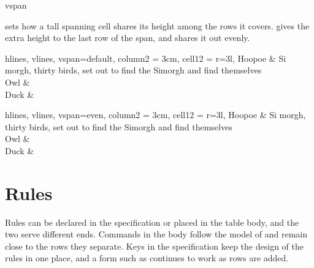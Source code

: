 \begin{codedescribe}[
    key,
    new=2021L
  ]{vspan}
  \begin{codesyntax}
  \end{codesyntax}
   sets how a tall spanning cell shares its height among the rows it covers.  gives the extra height to the last row of the span, and  shares it out evenly.

  \begin{codestore}[st=span:vspan]
    \begin{tblr}{
        hlines, vlines, vspan=default,
        column{2} = {3cm},
        cell{1}{2} = {r=3}{l},
      }
      Hoopoe & Si morgh, thirty birds, set out to find the Simorgh
      and find themselves                                          \\
      Owl    &                                                     \\
      Duck   &                                                     \\
    \end{tblr}\quad
    \begin{tblr}{
        hlines, vlines, vspan=even,
        column{2} = {3cm},
        cell{1}{2} = {r=3}{l},
      }
      Hoopoe & Si morgh, thirty birds, set out to find the Simorgh
      and find themselves                                          \\
      Owl    &                                                     \\
      Duck   &                                                     \\
    \end{tblr}\end{codestore}
  \begin{center}
  \end{center}
\end{codedescribe}

\section{Rules}\label{inner:rules}
Rules can be declared in the specification or placed in the table body, and the two serve different ends. Commands in the body follow the model of  and remain close to the rows they separate. Keys in the specification keep the design of the rules in one place, and a form such as  continues to work as rows are added.

